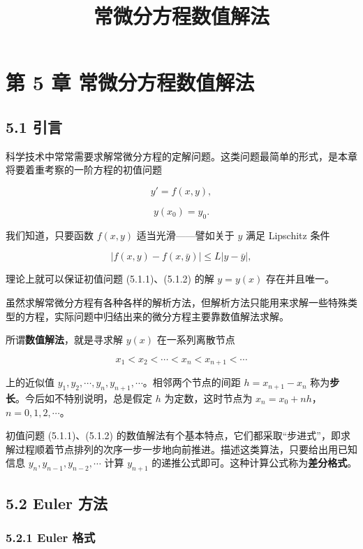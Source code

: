 \documentclass[
  10pt,
  fontset=fandol]{ctexart}
\title{常微分方程数值解法}
\author{}
\date{}
\begin{document}
\maketitle

\section{第 5 章 常微分方程数值解法}\label{ux7b2c-5-ux7ae0-ux5e38ux5faeux5206ux65b9ux7a0bux6570ux503cux89e3ux6cd5}

\subsection{5.1 引言}\label{ux5f15ux8a00}

科学技术中常常需要求解常微分方程的定解问题。这类问题最简单的形式，是本章将要着重考察的一阶方程的初值问题

\[
y'=f(x,y),\tag{5.1.1}
\]

\[
y(x_0)=y_0.\tag{5.1.2}
\]

我们知道，只要函数 \(f(x,y)\) 适当光滑------譬如关于 \(y\) 满足 Lipschitz 条件

\[
|f(x,y)-f(x,\bar y)|\leqslant L|y-\bar y|,
\]

理论上就可以保证初值问题 (5.1.1)、(5.1.2) 的解 \(y=y(x)\) 存在并且唯一。

虽然求解常微分方程有各种各样的解析方法，但解析方法只能用来求解一些特殊类型的方程，实际问题中归结出来的微分方程主要靠数值解法求解。

所谓\textbf{数值解法}，就是寻求解 \(y(x)\) 在一系列离散节点

\[
x_1<x_2<\cdots<x_n<x_{n+1}<\cdots
\]

上的近似值 \(y_1,\allowbreak y_2,\allowbreak \cdots,\allowbreak y_n,\allowbreak y_{n+1},\allowbreak \cdots\)。相邻两个节点的间距 \(h=x_{n+1}-x_n\) 称为\textbf{步长}。今后如不特别说明，总是假定 \(h\) 为定数，这时节点为 \(x_n=x_0+nh\)，\(n=0,1,2,\cdots\)。

初值问题 (5.1.1)、(5.1.2) 的数值解法有个基本特点，它们都采取``步进式''，即求解过程顺着节点排列的次序一步一步地向前推进。描述这类算法，只要给出用已知信息 \(y_n,y_{n-1},y_{n-2},\cdots\) 计算 \(y_{n+1}\) 的递推公式即可。这种计算公式称为\textbf{差分格式}。

\subsection{5.2 Euler 方法}\label{euler-ux65b9ux6cd5}

\subsubsection{5.2.1 Euler 格式}\label{euler-ux683cux5f0f}
\end{document}
